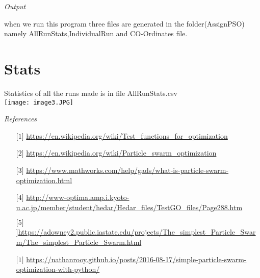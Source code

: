 \documentclass{article}
\begin{document}
\begin{center}
\begin{center}
\end{center}
\newpage

\begin{center}

\begin{center}
\emph{\LARGE Output}\\[1cm]
    
\end{center}
\begin{center}
\begin{minipage}{33em}
\noindent
when we run this program three files are generated in the folder(AssignPSO) namely AllRunStats,IndividualRun and CO-Ordinates file.

\section*{Stats}
Statistics of all the runs made is in file AllRunStats.csv
\\[10pt]
 \texttt{[image: image3.JPG]}
    \label{fig:Stats}

\end{minipage}
\end{center}

\end{center}
\newpage

\begin{center}
\emph{\LARGE References}\\[2.5cm]

\end{center}
\begin{minipage}{33em}
\indent
\noindent
\begin{enumerate}
    \item [$\lbrack 1 \rbrack$]\url{https://en.wikipedia.org/wiki/Test_functions_for_optimization}
    \item [$\lbrack 2 \rbrack$]\url{https://en.wikipedia.org/wiki/Particle_swarm_optimization}
    \item [$\lbrack 3 \rbrack$]\url{https://www.mathworks.com/help/gads/what-is-particle-swarm-optimization.html}
    \item [$\lbrack 4 \rbrack$]\url{http://www-optima.amp.i.kyoto-u.ac.jp/member/student/hedar/Hedar_files/TestGO_files/Page288.htm}
    \item [$\lbrack 5 \rbrack$]]\url{https://adowney2.public.iastate.edu/projects/The_simplest_Particle_Swarm/The_simplest_Particle_Swarm.html}
    \item [$\lbrack 1 \rbrack$]\url{https://nathanrooy.github.io/posts/2016-08-17/simple-particle-swarm-optimization-with-python/}
 

\end{enumerate}
\end{minipage}
\end{center}
\end{document}
